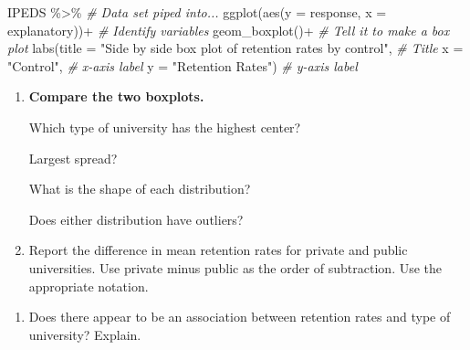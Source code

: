 \documentclass[
]{report}
\newenvironment{Shaded}{\begin{snugshade}}{\end{snugshade}}
\newcommand{\AttributeTok}[1]{\textcolor[rgb]{0.77,0.63,0.00}{#1}}
\newcommand{\CommentTok}[1]{\textcolor[rgb]{0.56,0.35,0.01}{\textit{#1}}}
\newcommand{\FunctionTok}[1]{\textcolor[rgb]{0.00,0.00,0.00}{#1}}
\newcommand{\NormalTok}[1]{#1}
\newcommand{\SpecialCharTok}[1]{\textcolor[rgb]{0.00,0.00,0.00}{#1}}
\newcommand{\StringTok}[1]{\textcolor[rgb]{0.31,0.60,0.02}{#1}}
\providecommand{\tightlist}{%
  \setlength{\itemsep}{0pt}\setlength{\parskip}{0pt}}
\begin{document}
\begin{Shaded}
\begin{Highlighting}[]
\NormalTok{IPEDS }\SpecialCharTok{\%\textgreater{}\%}  \CommentTok{\# Data set piped into...}
  \FunctionTok{ggplot}\NormalTok{(}\FunctionTok{aes}\NormalTok{(}\AttributeTok{y =}\NormalTok{ response, }\AttributeTok{x =}\NormalTok{ explanatory))}\SpecialCharTok{+}  \CommentTok{\# Identify variables}
  \FunctionTok{geom\_boxplot}\NormalTok{()}\SpecialCharTok{+}  \CommentTok{\# Tell it to make a box plot}
  \FunctionTok{labs}\NormalTok{(}\AttributeTok{title =} \StringTok{"Side by side box plot of retention rates by control"}\NormalTok{,  }\CommentTok{\# Title}
       \AttributeTok{x =} \StringTok{"Control"}\NormalTok{,    }\CommentTok{\# x{-}axis label}
       \AttributeTok{y =} \StringTok{"Retention Rates"}\NormalTok{)  }\CommentTok{\# y{-}axis label}
\end{Highlighting}
\end{Shaded}

\begin{enumerate}
\def\labelenumi{\arabic{enumi}.}
\setcounter{enumi}{15}
\item
  \textbf{Compare the two boxplots.}

  Which type of university has the highest center?
  \vspace{0.3in}

  Largest spread?
  \vspace{0.3in}

  What is the shape of each distribution?
  \vspace{0.3in}

  Does either distribution have outliers?
  \vspace{0.3in}
\item
  Report the difference in mean retention rates for private and public universities. Use private minus public as the order of subtraction. Use the appropriate notation.
\end{enumerate}

\vspace{0.8in}

\begin{enumerate}
\def\labelenumi{\arabic{enumi}.}
\setcounter{enumi}{17}
\tightlist
\item
  Does there appear to be an association between retention rates and type of university? Explain.
\end{enumerate}

\vspace{0.8in}
\end{document}
